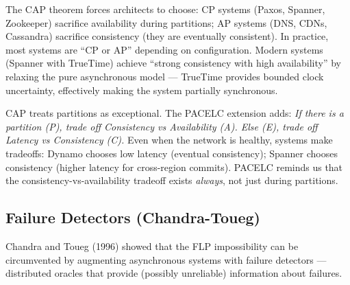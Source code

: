 The CAP theorem forces architects to choose: CP systems (Paxos, Spanner, Zookeeper) sacrifice availability during partitions; AP systems (DNS, CDNs, Cassandra) sacrifice consistency (they are eventually consistent). In practice, most systems are ``CP or AP'' depending on configuration. Modern systems (Spanner with TrueTime) achieve ``strong consistency with high availability'' by relaxing the pure asynchronous model — TrueTime provides bounded clock uncertainty, effectively making the system partially synchronous.

CAP treats partitions as exceptional. The PACELC extension adds: \emph{If there is a partition (P), trade off Consistency vs Availability (A). Else (E), trade off Latency vs Consistency (C).} Even when the network is healthy, systems make tradeoffs: Dynamo chooses low latency (eventual consistency); Spanner chooses consistency (higher latency for cross-region commits). PACELC reminds us that the consistency-vs-availability tradeoff exists \emph{always}, not just during partitions.

\subsection{Failure Detectors (Chandra-Toueg)}
\label{sec:consensus:detectors}

Chandra and Toueg (1996) showed that the FLP impossibility can be circumvented by augmenting asynchronous systems with failure detectors — distributed oracles that provide (possibly unreliable) information about failures.

